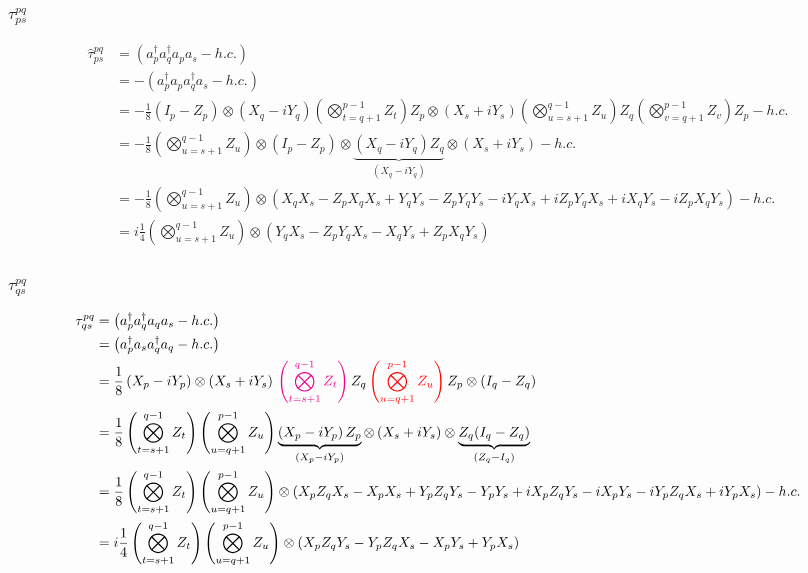 \documentclass[prb,amsmath,amsfonts,amssymb]{revtex4}
\newcommand{\red}{\color{red}{}}
\newcommand{\black}{\color{black}{}}
\newcommand{\magenta}{\color{magenta}{}}
\begin{document}
\subsubsection{$\tau^{pq}_{ps}$ }
\begin{align}
	\hat \tau_{ps}^{pq} &= \left(a^\dag_p a^\dag_q a_p a_s -h.c.\right)
	\nonumber\\
	&=- \left(a^\dag_p a_p a^\dag_q  a_s -h.c.\right)
	\nonumber\\
	&=-\frac{1}{8} (I_p - Z_p)\otimes (X_q-iY_q)\left(\bigotimes_{t=q+1}^{p-1} Z_t\right) Z_p\otimes (X_s + iY_s)\left(\bigotimes_{u=s+1}^{q-1} Z_u\right) Z_q \left(\bigotimes_{v=q+1}^{p-1} Z_v\right) Z_p - h.c.\nonumber\\
	&=-\frac{1}{8} \left(\bigotimes_{u=s+1}^{q-1} Z_u\right)  \otimes (I_p - Z_p)\otimes \underbrace{(X_q-iY_q)Z_q}_{(X_q-iY_q)}  \otimes (X_s + iY_s)- h.c.\nonumber\\
	&=-\frac{1}{8} \left(\bigotimes_{u=s+1}^{q-1} Z_u\right)  \otimes \left(X_q X_s -Z_p X_q X_s + Y_q Y_s - Z_p Y_q Y_s - i Y_q X_s +i Z_p Y_q X_s + i X_q Y_s - i Z_p X_q Y_s\right)- h.c.\nonumber\\	
	&=i \frac{1}{4} \left(\bigotimes_{u=s+1}^{q-1} Z_u\right)  \otimes \left( Y_q X_s - Z_p Y_q X_s - X_q Y_s +Z_p X_q Y_s\right)
\end{align}

\subsubsection{ $\tau^{pq}_{qs}$}
\begin{align}
	\tau_{qs}^{pq} & =   \left(a^\dag_p a_q^\dag a_q a_s -h.c.\right)\nonumber\\
	&=   \left(a^\dag_p a_s a_q^\dag a_q -h.c.\right)\nonumber\\
	&= \frac{1}{8} \left(X_p - iY_p\right)  \otimes \left(X_s + i Y_s\right)
\magenta \left(\bigotimes_{t=s+1}^{q-1} Z_t \right)
\black Z_q
\red \left(\bigotimes_{u=q+1}^{p-1} Z_{u} \right)
\black Z_p
\otimes (I_q - Z_q)
\nonumber\\
&= \frac{1}{8}  \left(\bigotimes_{t=s+1}^{q-1} Z_t \right) \left(\bigotimes_{u=q+1}^{p-1} Z_{u} \right) 
\underbrace{\left(X_p - iY_p\right)Z_p}_{(X_p - iY_p)}  \otimes \left(X_s + i Y_s\right)
\otimes\underbrace{ Z_q (I_q - Z_q)}_{(Z_q - I_q)}
\nonumber\\
	&= \frac{1}{8} \left(\bigotimes_{t=s+1}^{q-1}Z_t \right)  \left(\bigotimes_{u=q+1}^{p-1}Z_u \right) \otimes (X_pZ_q X_s -X_p X_s + Y_p Z_q Y_s - Y_pY_s + i X_p Z_q Y_s - iX_p Y_s - i Y_p Z_q X_s + iY_p X_s)-h.c.\nonumber\\
	&= i\frac{1}{4} \left(\bigotimes_{t=s+1}^{q-1}Z_t \right)  \left(\bigotimes_{u=q+1}^{p-1}Z_u \right) \otimes ( X_p Z_q Y_s - Y_p Z_q X_s - X_p Y_s  +Y_p X_s)
\end{align}
\end{document}

